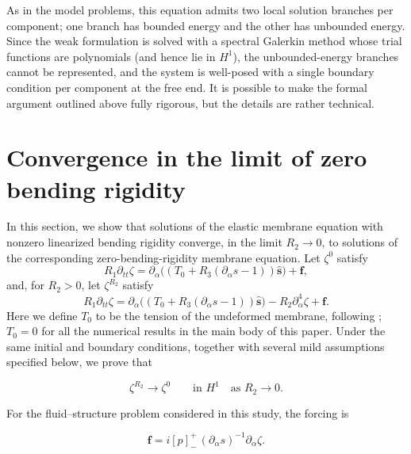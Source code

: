 \documentclass{article}[12pt]
\theoremstyle{Theorem}
\begin{document}
As in the model problems, this equation admits two local solution branches per component; one branch has bounded energy and the other has unbounded energy. Since the weak formulation is solved with a spectral Galerkin method whose trial functions are polynomials (and hence lie in $H^1$), the unbounded-energy branches cannot be represented, and the system is well-posed with a single boundary condition per component at the free end. It is possible to make the formal argument outlined above fully rigorous, but the details are rather technical.

\section{Convergence in the limit of zero bending rigidity}
\label{convergence in the limit of zero bending rigidity section}
In this section, we show that solutions of the elastic membrane equation with nonzero linearized bending rigidity converge, in the limit \(R_2\to 0\), to solutions of the corresponding zero-bending-rigidity membrane equation. Let \(\zeta^0\) satisfy
\begin{equation}
R_1\partial_{tt}\zeta
= \partial_\alpha\big((T_0+R_3(\partial_\alpha s-1))\hat{\boldsymbol{s}}\big)
+ \boldsymbol{f},
\label{membrane with force equation}
\end{equation}
and, for \(R_2>0\), let \(\zeta^{R_2}\) satisfy
\begin{equation}
R_1\partial_{tt}\zeta
= \partial_\alpha\big((T_0+R_3(\partial_\alpha s-1))\hat{\boldsymbol{s}}\big)
-R_2\partial_\alpha^4\zeta
+ \boldsymbol{f}.
\label{membrane with linearized bending rigidity with force equation}
\end{equation}
Here we define \(T_0\) to be the tension of the undeformed membrane, following \cite{mavroyiakoumou2020large}; $T_0 = 0$ for all the numerical results in the main body of this paper.
Under the same initial and boundary conditions, together with several mild assumptions specified below, we prove that

$$
    \zeta^{R_2}\to\zeta^0
    \qquad\text{in }H^1
    \quad\text{as }R_2\to0.
$$

For the fluid--structure problem considered in this study, the forcing is

$$
    \boldsymbol{f}
    = i[p]^+_-\,(\partial_\alpha s)^{-1}\partial_\alpha\zeta.
$$
\end{document}
